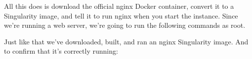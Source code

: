 \documentclass[letterpaper,10pt,english]{sphinxmanual}
\begin{document}
%
\begin{sphinxVerbatim}[commandchars=\\\{\}]
 

 

 



\end{sphinxVerbatim}

All this does is download the official nginx Docker container, convert
it to a Singularity image, and tell it to run nginx when you start the
instance. Since we’re running a web server, we’re going to run the
following commands as root.

%
\begin{sphinxVerbatim}[commandchars=\\\{\}]

\end{sphinxVerbatim}

Just like that we’ve downloaded, built, and ran an nginx Singularity
image. And to confirm that it’s correctly running:
\end{document}
